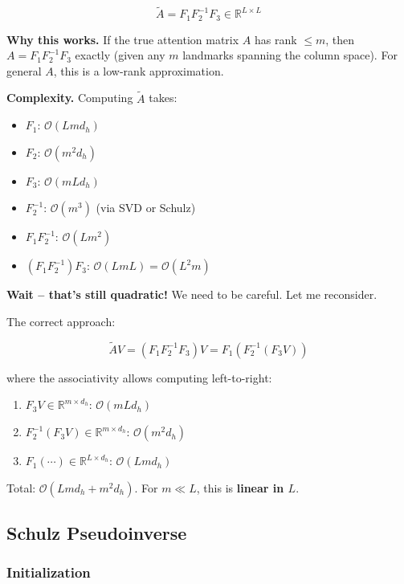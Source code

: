 \begin{equation}
\tilde{A} = F_1 F_2^{-1} F_3 \in \mathbb{R}^{L \times L}
\end{equation}

\textbf{Why this works.} If the true attention matrix $A$ has rank $\le m$, then 
$A = F_1 F_2^{-1} F_3$ exactly (given any $m$ landmarks spanning the column 
space). For general $A$, this is a low-rank approximation.

\textbf{Complexity.} Computing $\tilde{A}$ takes:

\begin{itemize}
\item $F_1$: $\mathcal{O}(L m d_h)$
\item $F_2$: $\mathcal{O}(m^2 d_h)$
\item $F_3$: $\mathcal{O}(m L d_h)$
\item $F_2^{-1}$: $\mathcal{O}(m^3)$ (via SVD or Schulz)
\item $F_1 F_2^{-1}$: $\mathcal{O}(L m^2)$
\item $(F_1 F_2^{-1}) F_3$: $\mathcal{O}(L m L) = \mathcal{O}(L^2 m)$

\end{itemize}
\textbf{Wait -- that's still quadratic!} We need to be careful. Let me reconsider.

The correct approach:

\begin{equation}
\tilde{A} V = (F_1 F_2^{-1} F_3) V = F_1 (F_2^{-1} (F_3 V))
\end{equation}

where the associativity allows computing left-to-right:

\begin{enumerate}
\item $F_3 V \in \mathbb{R}^{m \times d_h}$: $\mathcal{O}(m L d_h)$
\item $F_2^{-1} (F_3 V) \in \mathbb{R}^{m \times d_h}$: $\mathcal{O}(m^2 d_h)$
\item $F_1 (\cdots) \in \mathbb{R}^{L \times d_h}$: $\mathcal{O}(L m d_h)$

\end{enumerate}
Total: $\mathcal{O}(L m d_h + m^2 d_h)$. For $m \ll L$, this is \textbf{linear in $L$}.

\subsection{Schulz Pseudoinverse}

\subsubsection{Initialization}

